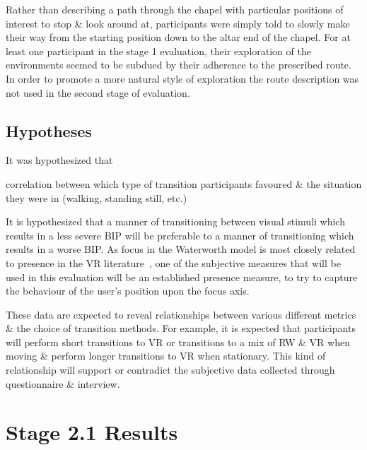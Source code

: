 Rather than describing a path through the chapel with particular positions of interest to stop \& look around at, participants were simply told to slowly make their way from the starting position down to the altar end of the chapel. For at least one participant in the stage 1 evaluation, their exploration of the environments seemed to be subdued by their adherence to the prescribed route. In order to promote a more natural style of exploration the route description was not used in the second stage of evaluation.


\subsection{Hypotheses}

It was hypothesized that

correlation between which type of transition participants favoured \& the situation they were in (walking, standing still, etc.)



It is hypothesized that a manner of transitioning between visual stimuli which results in a less severe BIP will be preferable to a manner of transitioning which results in a worse BIP. As focus in the Waterworth model is most closely related to presence in the VR literature~\cite{Waterworth2001}, one of the subjective measures that will be used in this evaluation will be an established presence measure, to try to capture the behaviour of the user's position upon the focus axis.


These data are expected to reveal relationships between various different metrics \& the choice of transition methods. For example, it is expected that participants will perform short transitions to VR or transitions to a mix of RW \& VR when moving \& perform longer transitions to VR when stationary. This kind of relationship will support or contradict the subjective data collected through questionnaire \& interview.


\section{Stage 2.1 Results}

